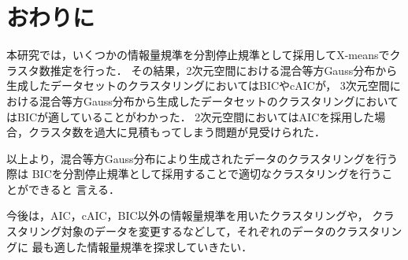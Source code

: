 \section{おわりに}

本研究では，いくつかの情報量規準を分割停止規準として採用してX-meansでクラスタ数推定を行った．
その結果，2次元空間における混合等方Gauss分布から生成したデータセットのクラスタリングにおいてはBICやcAICが，
3次元空間における混合等方Gauss分布から生成したデータセットのクラスタリングにおいてはBICが適していることがわかった．
2次元空間においてはAICを採用した場合，クラスタ数を過大に見積もってしまう問題が見受けられた．

以上より，混合等方Gauss分布により生成されたデータのクラスタリングを行う際は
BICを分割停止規準として採用することで適切なクラスタリングを行うことができると
言える．

今後は，AIC，cAIC，BIC以外の情報量規準を用いたクラスタリングや，
クラスタリング対象のデータを変更するなどして，それぞれのデータのクラスタリングに
最も適した情報量規準を探求していきたい．

